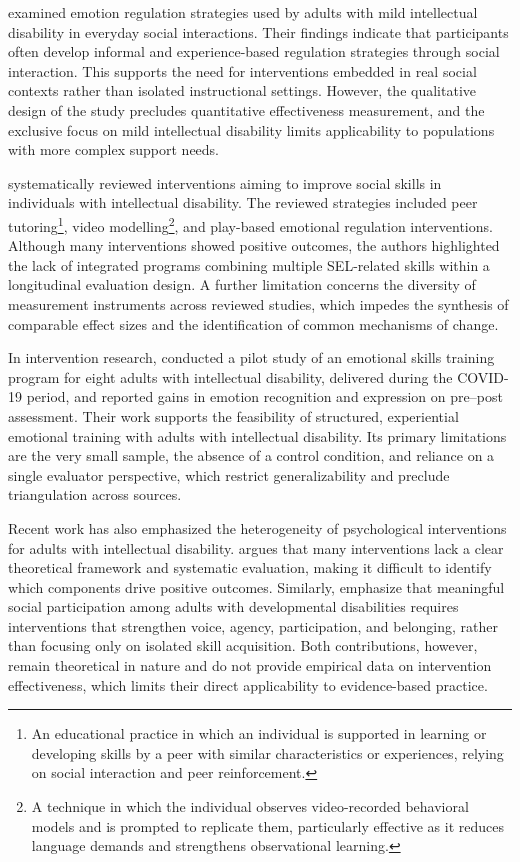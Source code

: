 \documentclass[12pt,a4paper]{article}
\begin{document}
\textcite{littlewood2018} examined emotion regulation strategies used by adults with mild intellectual disability in everyday social interactions. Their findings indicate that participants often develop informal and experience-based regulation strategies through social interaction. This supports the need for interventions embedded in real social contexts rather than isolated instructional settings. However, the qualitative design of the study precludes quantitative effectiveness measurement, and the exclusive focus on mild intellectual disability limits applicability to populations with more complex support needs.

\textcite{jacob2022} systematically reviewed interventions aiming to improve social skills in individuals with intellectual disability. The reviewed strategies included peer tutoring\footnote{An educational practice in which an individual is supported in learning or developing skills by a peer with similar characteristics or experiences, relying on social interaction and peer reinforcement.}, video modelling\footnote{A technique in which the individual observes video-recorded behavioral models and is prompted to replicate them, particularly effective as it reduces language demands and strengthens observational learning.}, and play-based emotional regulation interventions. Although many interventions showed positive outcomes, the authors highlighted the lack of integrated programs combining multiple SEL-related skills within a longitudinal evaluation design. A further limitation concerns the diversity of measurement instruments across reviewed studies, which impedes the synthesis of comparable effect sizes and the identification of common mechanisms of change.

In intervention research, \textcite{vanutelli2023} conducted a pilot study of an emotional skills training program for eight adults with intellectual disability, delivered during the COVID-19 period, and reported gains in emotion recognition and expression on pre--post assessment. Their work supports the feasibility of structured, experiential emotional training with adults with intellectual disability. Its primary limitations are the very small sample, the absence of a control condition, and reliance on a single evaluator perspective, which restrict generalizability and preclude triangulation across sources.

Recent work has also emphasized the heterogeneity of psychological interventions for adults with intellectual disability. \textcite{witwer2022} argues that many interventions lack a clear theoretical framework and systematic evaluation, making it difficult to identify which components drive positive outcomes. Similarly, \textcite{mcnaughton2025} emphasize that meaningful social participation among adults with developmental disabilities requires interventions that strengthen voice, agency, participation, and belonging, rather than focusing only on isolated skill acquisition. Both contributions, however, remain theoretical in nature and do not provide empirical data on intervention effectiveness, which limits their direct applicability to evidence-based practice.
\end{document}
